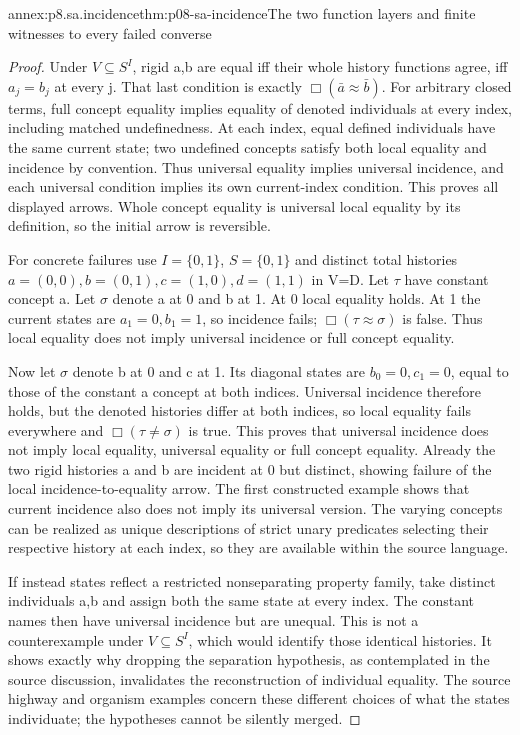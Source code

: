 \begin{annexitem}{annex:p8.sa.incidence}{thm:p08-sa-incidence}{The two function layers and finite witnesses to every failed converse}
\begin{proof}
Under \(V\subseteq S^I\), rigid a,b are equal iff their
whole history functions agree, iff \(a_j=b_j\) at every j.
That last condition is exactly \(\Box(\bar a\approx\bar b)\).
For arbitrary closed terms, full concept equality implies
equality of denoted individuals at every index, including matched
undefinedness. At each index, equal defined individuals have
the same current state; two undefined concepts satisfy both
local equality and incidence by convention. Thus universal
equality implies universal incidence, and each universal
condition implies its own current-index condition. This proves
all displayed arrows. Whole concept equality is universal local
equality by its definition, so the initial arrow is reversible.

For concrete failures use \(I=\{0,1\}\), \(S=\{0,1\}\)
and distinct total histories
\(a=(0,0),b=(0,1),c=(1,0),d=(1,1)\) in V=D.
Let \(\tau\) have constant concept a. Let \(\sigma\)
denote a at 0 and b at 1. At 0 local equality holds. At 1
the current states are \(a_1=0,b_1=1\), so incidence fails;
\(\Box(\tau\approx\sigma)\) is false. Thus local equality
does not imply universal incidence or full concept equality.

Now let \(\sigma\) denote b at 0 and c at 1. Its diagonal
states are \(b_0=0,c_1=0\), equal to those of the constant
a concept at both indices. Universal incidence therefore holds,
but the denoted histories differ at both indices, so local
equality fails everywhere and \(\Box(\tau\ne\sigma)\)
is true. This proves that universal incidence does not imply
local equality, universal equality or full concept equality.
Already the two rigid histories a and b are incident at 0 but
distinct, showing failure of the local incidence-to-equality
arrow. The first constructed example shows that current
incidence also does not imply its universal version. The varying
concepts can be realized as unique descriptions of strict unary
predicates selecting their respective history at each index,
so they are available within the source language.

If instead states reflect a restricted nonseparating property
family, take distinct individuals a,b and assign both the same
state at every index. The constant names then have universal
incidence but are unequal. This is not a counterexample under
\(V\subseteq S^I\), which would identify those identical
histories. It shows exactly why dropping the separation
hypothesis, as contemplated in the source discussion, invalidates
the reconstruction of individual equality. The source highway
and organism examples concern these different choices of what
the states individuate; the hypotheses cannot be silently merged.
\end{proof}
\end{annexitem}

